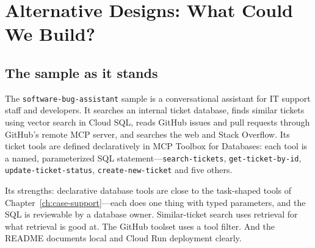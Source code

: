 \section{Alternative Designs: What Could We Build?}
\label{sec:inc-designs}

\subsection{The sample as it stands}

The \texttt{software-bug-assistant} sample is a conversational assistant for IT support staff and developers. It searches an internal ticket database, finds similar tickets using vector search in Cloud SQL, reads GitHub issues and pull requests through GitHub's remote MCP server, and searches the web and Stack Overflow. Its ticket tools are defined declaratively in MCP Toolbox for Databases: each tool is a named, parameterized SQL statement---\texttt{search-tickets}, \texttt{get-ticket-by-id}, \texttt{update-ticket-status}, \texttt{create-new-ticket} and five others.

Its strengths: declarative database tools are close to the task-shaped tools of Chapter~\ref{ch:case-support}---each does one thing with typed parameters, and the SQL is reviewable by a database owner. Similar-ticket search uses retrieval for what retrieval is good at. The GitHub toolset uses a tool filter. And the README documents local and Cloud Run deployment clearly.

